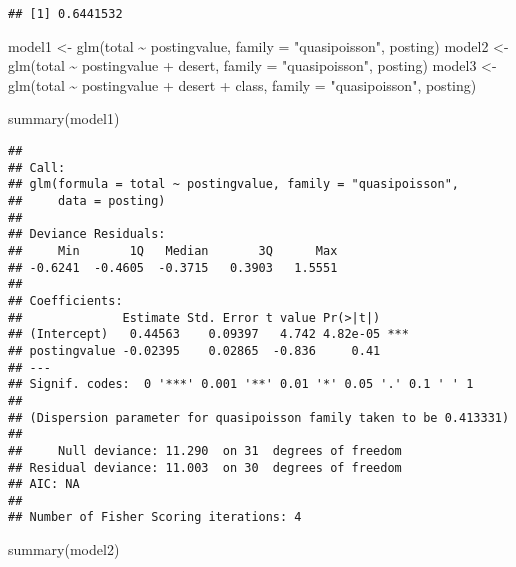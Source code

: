 \documentclass[
]{article}
\newenvironment{Shaded}{\begin{snugshade}}{\end{snugshade}}
\newcommand{\AttributeTok}[1]{\textcolor[rgb]{0.77,0.63,0.00}{#1}}
\newcommand{\FunctionTok}[1]{\textcolor[rgb]{0.00,0.00,0.00}{#1}}
\newcommand{\NormalTok}[1]{#1}
\newcommand{\OtherTok}[1]{\textcolor[rgb]{0.56,0.35,0.01}{#1}}
\newcommand{\SpecialCharTok}[1]{\textcolor[rgb]{0.00,0.00,0.00}{#1}}
\newcommand{\StringTok}[1]{\textcolor[rgb]{0.31,0.60,0.02}{#1}}
\begin{document}
\begin{verbatim}
## [1] 0.6441532
\end{verbatim}

\begin{Shaded}
\begin{Highlighting}[]
\NormalTok{model1 }\OtherTok{\textless{}{-}} \FunctionTok{glm}\NormalTok{(total }\SpecialCharTok{\textasciitilde{}}\NormalTok{ postingvalue, }\AttributeTok{family =} \StringTok{"quasipoisson"}\NormalTok{, posting)}
\NormalTok{model2 }\OtherTok{\textless{}{-}} \FunctionTok{glm}\NormalTok{(total }\SpecialCharTok{\textasciitilde{}}\NormalTok{ postingvalue }\SpecialCharTok{+}\NormalTok{ desert, }\AttributeTok{family =} \StringTok{"quasipoisson"}\NormalTok{, posting)}
\NormalTok{model3 }\OtherTok{\textless{}{-}} \FunctionTok{glm}\NormalTok{(total }\SpecialCharTok{\textasciitilde{}}\NormalTok{ postingvalue }\SpecialCharTok{+}\NormalTok{ desert }\SpecialCharTok{+}\NormalTok{ class, }\AttributeTok{family =} \StringTok{"quasipoisson"}\NormalTok{, posting)}

\FunctionTok{summary}\NormalTok{(model1)}
\end{Highlighting}
\end{Shaded}

\begin{verbatim}
## 
## Call:
## glm(formula = total ~ postingvalue, family = "quasipoisson", 
##     data = posting)
## 
## Deviance Residuals: 
##     Min       1Q   Median       3Q      Max  
## -0.6241  -0.4605  -0.3715   0.3903   1.5551  
## 
## Coefficients:
##              Estimate Std. Error t value Pr(>|t|)    
## (Intercept)   0.44563    0.09397   4.742 4.82e-05 ***
## postingvalue -0.02395    0.02865  -0.836     0.41    
## ---
## Signif. codes:  0 '***' 0.001 '**' 0.01 '*' 0.05 '.' 0.1 ' ' 1
## 
## (Dispersion parameter for quasipoisson family taken to be 0.413331)
## 
##     Null deviance: 11.290  on 31  degrees of freedom
## Residual deviance: 11.003  on 30  degrees of freedom
## AIC: NA
## 
## Number of Fisher Scoring iterations: 4
\end{verbatim}

\begin{Shaded}
\begin{Highlighting}[]
\FunctionTok{summary}\NormalTok{(model2)}
\end{Highlighting}
\end{Shaded}
\end{document}
